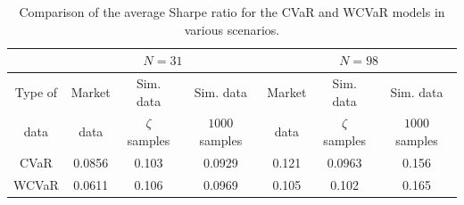 \documentclass[12pt]{article}
\numberwithin{equation}{section}
\begin{document}
\begin{table}[!h]
  \centering
  \small
    \captionsetup{justification=centering}
  \begin{tabular}{|c|c|c|c|c|c|c|}
    \hline
   \multirow{2}{*}{} $N$ &
      \multicolumn{3}{c|}{$N=31$} &
      \multicolumn{3}{c|}{$N=98$}  \\
    \hline
    Type of & Market & Sim. data & Sim. data & Market & Sim. data & Sim. data \\
    data & data & $\zeta$ samples & $1000$ samples & data & $\zeta$ samples & $1000$ samples \\
    \hline
    CVaR & 0.0856 & 0.103 & 0.0929 & 0.121 & 0.0963 & 0.156 \\
    \hline
    WCVaR & 0.0611 & 0.106 & 0.0969 & 0.105 & 0.102 & 0.165 \\
    \hline
  \end{tabular}
  \caption{Comparison of the average Sharpe ratio for the CVaR and WCVaR models in various scenarios.}
  \label{tab:cvar_conc}
\end{table}
\end{document}
